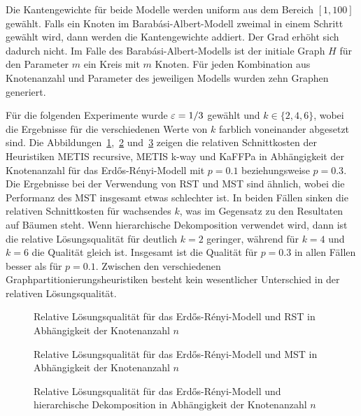 Die Kantengewichte für beide Modelle werden uniform aus dem Bereich $[1, 100]$ gewählt.
Falls ein Knoten im Barabási-Albert-Modell zweimal in einem Schritt gewählt wird, dann werden die Kantengewichte addiert.
Der Grad erhöht sich dadurch nicht.
Im Falle des Barabási-Albert-Modells ist der initiale Graph $H$ für den Parameter $m$ ein Kreis mit $m$ Knoten.
Für jeden Kombination aus Knotenanzahl und Parameter des jeweiligen Modells wurden zehn Graphen generiert.

Für die folgenden Experimente wurde $\varepsilon=1/3$ gewählt und $k \in \{2, 4, 6\}$, wobei die Ergebnisse für die verschiedenen Werte von $k$ farblich voneinander abgesetzt sind.
Die Abbildungen~\ref{fig:edgeprobrstnode},~\ref{fig:edgeprobmstnode} und~\ref{fig:edgeprobhdecompnode} zeigen die relativen Schnittkosten der Heuristiken METIS recursive, METIS k-way und KaFFPa in Abhängigkeit der Knotenanzahl für das Erdős-Rényi-Modell mit $p=0.1$ beziehungsweise $p=0.3$.
Die Ergebnisse bei der Verwendung von RST und MST sind ähnlich, wobei die Performanz des MST insgesamt etwas schlechter ist.
In beiden Fällen sinken die relativen Schnittkosten für wachsendes $k$, was im Gegensatz zu den Resultaten auf Bäumen steht.
Wenn hierarchische Dekomposition verwendet wird, dann ist die relative Lösungsqualität für deutlich $k=2$ geringer, während für $k=4$ und $k=6$ die Qualität gleich ist.
Insgesamt ist die Qualität für $p=0.3$ in allen Fällen besser als für $p=0.1$.
Zwischen den verschiedenen Graphpartitionierungsheuristiken besteht kein wesentlicher Unterschied in der relativen Lösungsqualität.

\vfill\clearpage

\begin{figure}[H]
    \centering
    
    \caption{Relative Lösungsqualität für das Erdős-Rényi-Modell und RST in Abhängigkeit der Knotenanzahl $n$\label{fig:edgeprobrstnode}}
\end{figure}

\begin{figure}[H]
    \centering
    
    \caption{Relative Lösungsqualität für das Erdős-Rényi-Modell und MST in Abhängigkeit der Knotenanzahl $n$\label{fig:edgeprobmstnode}}
\end{figure}

\begin{figure}[H]
    \centering
    
    \caption{Relative Lösungsqualität für das Erdős-Rényi-Modell und hierarchische Dekomposition in Abhängigkeit der Knotenanzahl $n$\label{fig:edgeprobhdecompnode}}
\end{figure}

